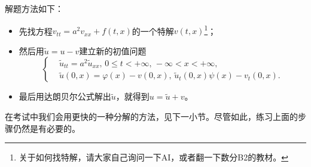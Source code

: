 解题方法如下：
\begin{itemize}
    \item 先找方程$v_{tt} = a^2 v_{xx} + f(t, x)$的一个特解$v(t, x)$\footnote{关于如何找特解，请大家自己询问一下AI，或者翻一下数分B2的教材。}；
    \item 然后用$\tilde{u} = u - v$建立新的初值问题
        \begin{equation*}
            \left\{
                \begin{aligned}
                    &\tilde{u}_{tt} = a^2 \tilde{u}_{xx},\, 0 \leq t < +\infty,\, -\infty < x < +\infty,\\
                    &\tilde{u}(0, x) = \varphi(x) - v(0, x),\, \tilde{u}_t(0, x) \psi(x) - v_t(0, x).
                \end{aligned}
            \right.
        \end{equation*}
    \item 最后用达朗贝尔公式解出$\tilde{u}$，就得到$u = \tilde{u} + v$。
\end{itemize}
在考试中我们会用更快的一种分解的方法，见下一小节。尽管如此，练习上面的步骤仍然是有必要的。
